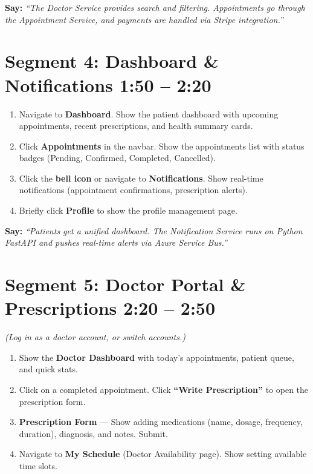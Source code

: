 \documentclass[11pt,a4paper]{article}
\begin{document}
\textbf{Say:} \textit{``The Doctor Service provides search and filtering. Appointments go through the Appointment Service, and payments are handled via Stripe integration.''}

\section{Segment 4: Dashboard \& Notifications \hfill \textcolor{timecolor}{\normalsize 1:50 -- 2:20}}

\begin{enumerate}[leftmargin=1.5em, label=\textbf{\arabic*.}]
  \item Navigate to \textbf{Dashboard}. Show the patient dashboard with upcoming appointments, recent prescriptions, and health summary cards.
  \item Click \textbf{Appointments} in the navbar. Show the appointments list with status badges (Pending, Confirmed, Completed, Cancelled).
  \item Click the \textbf{bell icon} or navigate to \textbf{Notifications}. Show real-time notifications (appointment confirmations, prescription alerts).
  \item Briefly click \textbf{Profile} to show the profile management page.
\end{enumerate}

\textbf{Say:} \textit{``Patients get a unified dashboard. The Notification Service runs on Python FastAPI and pushes real-time alerts via Azure Service Bus.''}

\section{Segment 5: Doctor Portal \& Prescriptions \hfill \textcolor{timecolor}{\normalsize 2:20 -- 2:50}}

\textit{(Log in as a doctor account, or switch accounts.)}

\begin{enumerate}[leftmargin=1.5em, label=\textbf{\arabic*.}]
  \item Show the \textbf{Doctor Dashboard} with today's appointments, patient queue, and quick stats.
  \item Click on a completed appointment. Click \textbf{``Write Prescription''} to open the prescription form.
  \item \textbf{Prescription Form} --- Show adding medications (name, dosage, frequency, duration), diagnosis, and notes. Submit.
  \item Navigate to \textbf{My Schedule} (Doctor Availability page). Show setting available time slots.
\end{enumerate}
\end{document}

